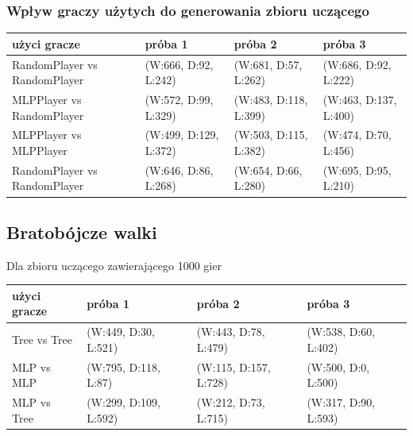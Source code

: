 \documentclass{article}
\begin{document}
\subsubsection{Wpływ graczy użytych do generowania zbioru uczącego}

\begin{center}
  \begin{tabular}{ | l | l | l | l | }
    \hline
    użyci gracze & próba 1 & próba 2 & próba 3 \\ \hline
    RandomPlayer vs RandomPlayer & (W:666, D:92, L:242) & (W:681, D:57, L:262) & (W:686, D:92, L:222) \\ \hline
    MLPPlayer vs RandomPlayer & (W:572, D:99, L:329) & (W:483, D:118, L:399) & (W:463, D:137, L:400) \\ \hline
    MLPPlayer vs MLPPlayer & (W:499, D:129, L:372) & (W:503, D:115, L:382) & (W:474, D:70, L:456) \\ \hline
    RandomPlayer vs RandomPlayer & (W:646, D:86, L:268) & (W:654, D:66, L:280) & (W:695, D:95, L:210) \\ \hline
  \end{tabular}
\end{center}

\subsection{Bratobójcze walki}

Dla zbioru uczącego zawierającego 1000 gier

\begin{center}
  \begin{tabular}{ | l | l | l | l | }
    \hline
    użyci gracze & próba 1 & próba 2 & próba 3 \\ \hline
    Tree vs Tree & (W:449, D:30, L:521) & (W:443, D:78, L:479) & (W:538, D:60, L:402) \\ \hline
    MLP vs MLP & (W:795, D:118, L:87) & (W:115, D:157, L:728) & (W:500, D:0, L:500) \\ \hline
    MLP vs Tree & (W:299, D:109, L:592) & (W:212, D:73, L:715) & (W:317, D:90, L:593) \\ \hline
  \end{tabular}
\end{center}
\end{document}
